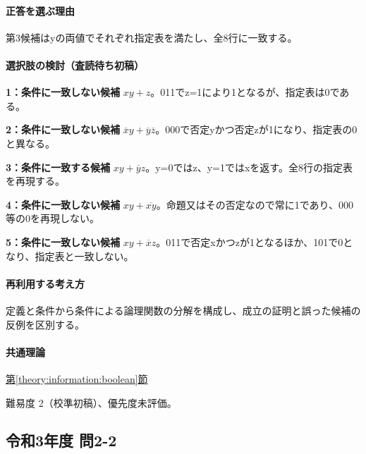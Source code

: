 \paragraph{正答を選ぶ理由} 第3候補はyの両値でそれぞれ指定表を満たし、全8行に一致する。

\paragraph{選択肢の検討（査読待ち初稿）}\mbox{}\par

\noindent\textbf{1：条件に一致しない候補} \(xy+z\)。011でz=\allowbreak{}1により1となるが、指定表は0である。\par

\noindent\textbf{2：条件に一致しない候補} \(\overline x y+\overline y\overline z\)。000で否定yかつ否定zが1になり、指定表の0と異なる。\par

\noindent\textbf{3：条件に一致する候補} \(xy+\overline y z\)。y=\allowbreak{}0ではz、y=\allowbreak{}1ではxを返す。全8行の指定表を再現する。\par

\noindent\textbf{4：条件に一致しない候補} \(xy+\overline{xy}\)。命題又はその否定なので常に1であり、000等の0を再現しない。\par

\noindent\textbf{5：条件に一致しない候補} \(xy+\overline x z\)。011で否定xかつzが1となるほか、101で0となり、指定表と一致しない。\par

\paragraph{再利用する考え方} 定義と条件から条件による論理関数の分解を構成し、成立の証明と誤った候補の反例を区別する。

\paragraph{共通理論} \hyperref[theory:information:boolean]{第\ref*{theory:information:boolean}節}

\par 難易度 2（校準初稿）、優先度未評価。

\subsection{令和3年度 問2-2}
\label{q:r03-reg-basic-2-2}


